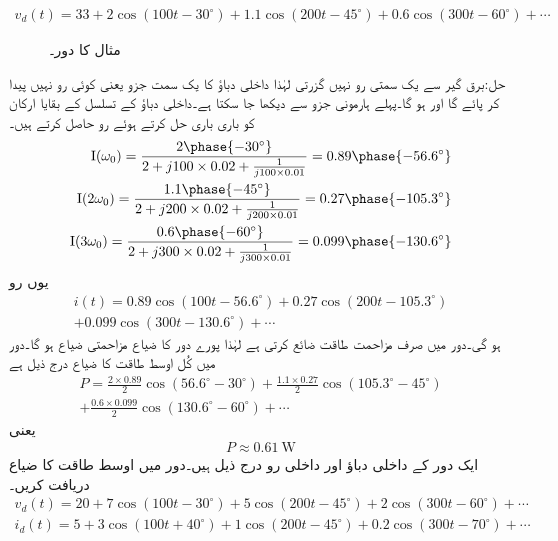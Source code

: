 \begin{align*}
v_d(t)=33+2\cos(100t-30^{\circ})+1.1\cos(200t-45^{\circ})+0.6\cos(300t-60^{\circ})+\cdots
\end{align*}
%
\begin{figure}
\centering
{}
\caption{مثال  کا دور۔}
\label{شکل_فوریئر_اوسط_طاقت_الف}
\end{figure}

حل:برق گیر  سے   یک سمتی رو نہیں گزرتی لہٰذا داخلی دباؤ کا یک سمت جزو یعنی  کوئی رو نہیں پیدا کر پائے گا اور  ہو گا۔پہلے ہارمونی جزو سے  دیکھا جا سکتا ہے۔داخلی دباؤ کے تسلسل کے بقایا ارکان کو باری باری حل کرتے  ہوئے رو حاصل کرتے ہیں۔
\begin{align*}
\bI(\omega_0)=\frac{2\phase{-30^{\circ}}}{2+j100\times 0.02+\frac{1}{j100\times 0.01}}=0.89\phase{-56.6^{\circ}}\\
\bI(2\omega_0)=\frac{1.1\phase{-45^{\circ}}}{2+j200\times 0.02+\frac{1}{j200\times 0.01}}=0.27\phase{-105.3^{\circ}}\\
\bI(3\omega_0)=\frac{0.6\phase{-60^{\circ}}}{2+j300\times 0.02+\frac{1}{j300\times 0.01}}=0.099\phase{-130.6^{\circ}}
\end{align*}
یوں رو
\begin{multline*}
i(t)=0.89\cos(100t-56.6^{\circ})+0.27\cos(200t-105.3^{\circ})\\
+0.099\cos(300t-130.6^{\circ})+\cdots
\end{multline*}
ہو گی۔دور میں صرف مزاحمت طاقت ضائع کرتی ہے لہٰذا پورے دور کا ضیاع مزاحمتی ضیاع ہو گا۔دور میں کُل اوسط طاقت کا ضیاع درج ذیل ہے
\begin{multline*}
P=\frac{2\times 0.89}{2}\cos(56.6^{\circ}-30^{\circ})+\frac{1.1\times 0.27}{2}\cos(105.3^{\circ}-45^{\circ})\\
+\frac{0.6\times 0.099}{2}\cos(130.6^{\circ}-60^{\circ})+\cdots
\end{multline*}
یعنی
\begin{align*}
P\approx\SI{0.61}{\watt}
\end{align*}
ایک دور کے داخلی دباؤ اور داخلی رو درج ذیل ہیں۔دور میں اوسط طاقت کا ضیاع دریافت کریں۔
\begin{align*}
v_d(t)=20+7\cos(100t-30^{\circ})+5\cos(200t-45^{\circ})+2\cos(300t-60^{\circ})+\cdots\\
i_d(t)=5+3\cos(100t+40^{\circ})+1\cos(200t-45^{\circ})+0.2\cos(300t-70^{\circ})+\cdots
\end{align*}

